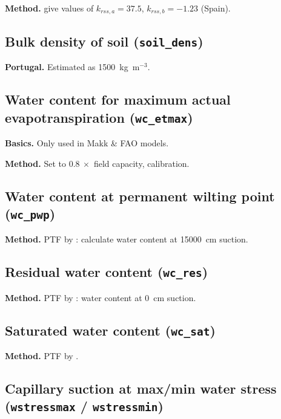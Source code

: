 \documentclass{scrreprt}
\begin{document}
\textbf{Method.}
\citet{domingo99} give values of $k_{rss,a} = 37.5$, $k_{rss,b} = -1.23$ (Spain).

\newpage
\subsection{Bulk density of soil (\texttt{soil\_dens})} \label{ssec:parest_soil_soildens}

\textbf{Portugal.}
Estimated as 1500~kg~m$^{-3}$.

\newpage
\subsection{Water content for maximum actual evapotranspiration (\texttt{wc\_etmax})} \label{ssec:parest_soil_wcetmax}

\textbf{Basics.}
Only used in Makk \& FAO models.

\noindent
\textbf{Method.}
Set to $0.8 ~ \times$ field capacity, calibration.

\newpage
\subsection{Water content at permanent wilting point (\texttt{wc\_pwp})} \label{ssec:parest_soil_wcpwp}

\textbf{Method.}
PTF by \citet{rawls85}: calculate water content at 15000~cm suction.

\newpage
\subsection{Residual water content (\texttt{wc\_res})} \label{ssec:parest_soil_wcres}

\textbf{Method.}
PTF by \citet{rawls85}: water content at 0~cm suction.

\newpage
\subsection{Saturated water content (\texttt{wc\_sat})} \label{ssec:parest_soil_wcsat}

\textbf{Method.}
PTF by \citet{woesten99}.

\newpage
\subsection{Capillary suction at max/min water stress (\texttt{wstressmax} / \texttt{wstressmin})} \label{ssec:parest_soil_wstress}
\end{document}

